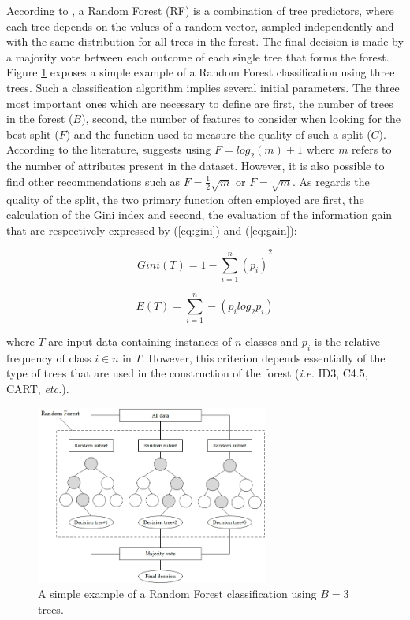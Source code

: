 \documentclass[conference]{IEEEtran}
\begin{document}
According to \citet{Breiman2001}, a Random Forest (RF) is a combination of tree predictors, where each tree depends on the values of a random vector, sampled independently and with the same distribution for all trees in the forest. The final decision is made by a majority vote between each outcome of each single tree that forms the forest. Figure \ref{fig:rf} exposes a simple example of a Random Forest classification using three trees. Such a classification algorithm implies several initial parameters. The three most important ones which are necessary to define are first, the number of trees in the forest ($B$), second, the number of features to consider when looking for the best split ($F$) and the function used to measure the quality of such a split ($C$). According to the literature, \citet{Breiman2001} suggests using $F=log_2(m) + 1$ where $m$ refers to the number of attributes present in the dataset. However, it is also possible to find other recommendations such as $F=\frac{1}{2}\sqrt{m}$ or $F=\sqrt{m}$. As regards the quality of the split, the two primary function often employed are first, the calculation of the Gini index and second, the evaluation of the information gain that are respectively expressed by (\ref{eq:gini}) and (\ref{eq:gain}):

\begin{equation}
	\label{eq:gini}
	Gini(T) = {1-\sum_{i=1}^{n}(p_i)}^2
\end{equation}

\begin{equation}
	\label{eq:gain}
	E(T) = \sum_{i=1}^{n}-(p_i log_2 p_i)
\end{equation}

\noindent where $T$ are input data containing instances of $n$ classes and $p_i$ is the relative frequency of class $i \in n$ in $T$. However, this criterion depends essentially of the type of trees that are used in the construction of the forest (\textit{i.e.} ID3, C4.5, CART, \textit{etc.}).

\begin{figure}[!t]
  \centering
  \includegraphics[width=3in]{rf}
  \caption{A simple example of a Random Forest classification using $B = 3$ trees.}
  \label{fig:rf}
\end{figure}
\end{document}
